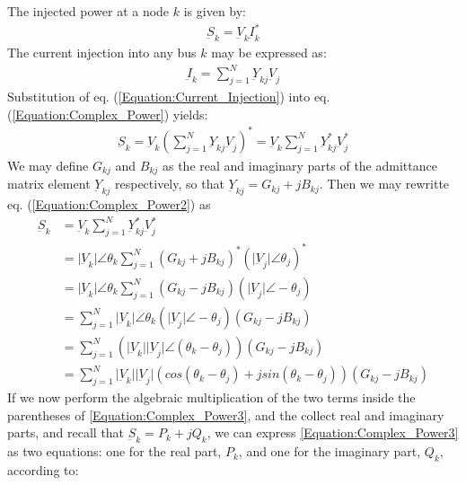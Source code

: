 \noindent The injected power at a node $k$ is given by:
\begin{align}
	\label{Equation:Complex_Power}
   \underbar{S}_{k} = \underbar{V}_{k} \underbar{I} _{k}^{*}
\end{align}
The current injection into any bus $k$ may be expressed as:
\begin{align}
	\label{Equation:Current_Injection}
   \underbar{I}_{k} = \sum_{j=1}^{N} \underbar{Y}_{kj} \underbar{V}_{j}
\end{align}
Substitution of eq. (\ref{Equation:Current_Injection}) into eq. (\ref{Equation:Complex_Power}) yields:
\begin{align}
	\label{Equation:Complex_Power2}
   \underbar{S}_{k} = \underbar{V}_{k} \left ( \sum_{j=1}^{N} \underbar{Y}_{kj} \underbar{V}_{j} \right )^{*}
   = \underbar{V}_{k} \sum_{j=1}^{N} \underbar{Y}_{kj}^{*} \underbar{V}_{j} ^{*}
\end{align}
We may define $G_{kj}$ and $B_{kj}$ as the real and imaginary parts of the admittance matrix element $\underbar{Y}_{kj}$ respectively, so that $\underbar{Y}_{kj} = G_{kj} + jB_{kj}$. Then we may rewritte eq. (\ref{Equation:Complex_Power2}) as
\begin{align}
   \underbar{S}_{k} &= \underbar{V}_{k} \sum_{j=1}^{N} \underbar{Y}_{kj}^{*} \underbar{V}_{j}^{*}  \nonumber \\
   							   &= \vert \underbar{V}_{k} \vert \angle \theta_{k} \sum_{j=1}^{N} (G_{kj} + jB_{kj})^{*} ( \vert \underbar{V}_{j} \vert \angle \theta_{j})^{*} \nonumber \\
   							   &= \vert \underbar{V}_{k} \vert \angle \theta_{k} \sum_{j=1}^{N} (G_{kj} - jB_{kj}) ( \vert \underbar{V}_{j} \vert \angle  - \theta_{j})  \nonumber  \\
   							   &= \sum_{j=1} ^{N} \vert \underbar{V}_{k} \vert \angle \theta_{k} ( \vert \underbar{V}_{j} \vert \angle - \theta_{j})  (G_{kj} - jB_{kj})  \nonumber \\
   							   &= \sum_{j=1} ^{N} \left ( \vert \underbar{V}_{k} \vert \vert \underbar{V}_{j} \vert \angle (\theta_{k} - \theta_{j}) \right )  (G_{kj} - jB_{kj})   \nonumber \\
   							   &= \sum_{j=1} ^{N} \vert \underbar{V}_{k} \vert \vert \underbar{V}_{j} \vert  \left ( cos(\theta_{k} - \theta_{j}) + jsin(\theta_{k} - \theta_{j}) \right )  (G_{kj} - 				 									jB_{kj})  \label{Equation:Complex_Power3}
\end{align}
If we now perform the algebraic multiplication of the two terms inside the parentheses of \ref{Equation:Complex_Power3}, and the collect real and imaginary parts, and recall that $\underbar{S}_{k} = P_{k} + jQ_{k}$, we can express \ref{Equation:Complex_Power3} as two equations: one for the real part, $P_{k}$, and one for the imaginary part, $Q_{k}$, according to:
